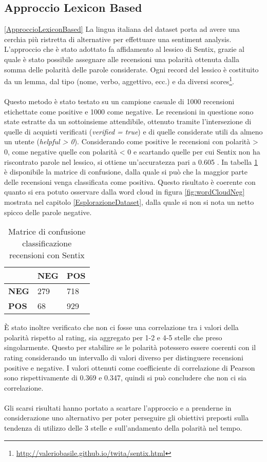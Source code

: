 \subsection{Approccio Lexicon Based}\ref{ApproccioLexiconBased}
La lingua italiana del dataset porta ad avere una cerchia più ristretta di alternative per effettuare una sentiment analysis. L'approccio che è stato adottato fa affidamento al lessico di Sentix, grazie al quale è stato possibile assegnare alle recensioni una polarità ottenuta dalla somma delle polarità delle parole considerate. Ogni record del lessico è costituito da un lemma, dal tipo (nome, verbo, aggettivo, ecc.) e da diversi scores\footnote{\url{http://valeriobasile.github.io/twita/sentix.html}}. 
\\\\
Questo metodo è stato testato su un campione casuale di 1000 recensioni etichettate come positive e 1000 come negative. Le recensioni in questione sono state estratte da un sottoinsieme attendibile, ottenuto tramite l'intersezione di quelle di acquisti verificati (\textit{verified = true}) e di quelle considerate utili da almeno un utente (\textit{helpful > 0}). Considerando come positive le recensioni con polarità > 0, come negative quelle con polarità < 0 e scartando quelle per cui Sentix non ha riscontrato parole nel lessico, si ottiene un'accuratezza pari a 0.605 . In tabella \ref{tab:matriceConfusione} è disponibile la matrice di confusione, dalla quale si può che la maggior parte delle recensioni venga classificata come positiva. Questo risultato è coerente con quanto si era potuto osservare dalla word cloud in figura \ref{fig:wordCloudNeg} mostrata nel capitolo \ref{EsplorazioneDataset}, dalla quale si non si nota un netto spicco delle parole negative.

\begin{table}[]
    \centering
    \begin{tabular}{l|l|l|}
    \cline{2-3}
     & \textbf{NEG} & \textbf{POS} \\ \hline
    \multicolumn{1}{|l|}{\textbf{NEG}} & 279 & 718 \\ \hline
    \multicolumn{1}{|l|}{\textbf{POS}} & 68 & 929 \\ \hline
    \end{tabular}
    \caption{Matrice di confusione classificazione recensioni con Sentix}
    \label{tab:matriceConfusione}
\end{table}

È stato inoltre verificato che non ci fosse una correlazione tra i valori della polarità rispetto al rating, sia aggregato per 1-2 e 4-5 stelle che preso singolarmente. Questo per stabilire se le polarità potessero essere coerenti con il rating considerando un intervallo di valori diverso per distinguere recensioni positive e negative. I valori ottenuti come coefficiente di correlazione di Pearson sono rispettivamente di 0.369 e 0.347, quindi si può concludere che non ci sia correlazione.
\\\\
Gli scarsi risultati hanno portato a scartare l'approccio e a prenderne in considerazione uno alternativo per poter perseguire gli obiettivi preposti sulla tendenza di utilizzo delle 3 stelle e sull'andamento della polarità nel tempo.


